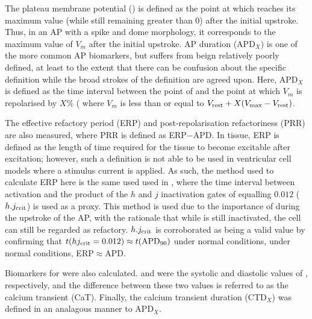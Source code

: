 \documentclass[../thesis-main.tex]{subfiles}
\begin{document}
The plateau membrane potential (\vplat{}) is defined as the point at which \dvdt{} reaches its maximum value (while still remaining greater than 0) after the initial upstroke. Thus, in an AP with a spike and dome morphology, it corresponds to the maximum value of $V_m$ after the initial upstroke. AP duration (APD$_X$) is one of the more common AP biomarkers, but suffers from beign relatively poorly defined, at least to the extent that there can be confusion about the specific definition while the broad strokes of the definition are agreed upon. Here, APD$_X$ is defined as the time interval between the point of \dvdtmax{} and the point at which $V_m$ is repolarised by $X\%$ (\idest{} where $V_m$ is less than or equal to $V_\textnormal{rest}+X(V_\textnormal{max}-V_\textnormal{rest})$.

The effective refactory period (ERP) and post-repolarisation refactoriness (PRR) are also measured, where PRR is defined as ERP$-$APD. In tissue, ERP is defined as the length of time required for the tissue to become excitable after excitation; however, such a definition is not able to be used in ventricular cell models where a stimulus current is applied. As such, the method used to calculate ERP here is the same used used in \citet{Tice2007, Romero2009a, Trenor2007, Pandit2013}, where the time interval between activation and the product of the $h$ and $j$ inactivation gates of \ina{} equalling $0.012$ ($h.j_\textnormal{crit}$) is used as a proxy. This method is used due to the importance of \ina{} during the upstroke of the AP, with the rationale that while \ina{} is still inactivated, the cell can still be regarded as refactory. $h.j_\textnormal{crit}$ is corroborated as being a valid value by confirming that $t(hj_\textnormal{crit}=0.012) \approx t(\textnormal{APD}_\textnormal{90})$ under normal conditions, \idest{} under normal conditions, ERP$\approx$APD.

Biomarkers for \cai{} were also calculated. \casys{} and \cadia{} were the systolic and diastolic values of \cai{}, respectively, and the difference between these two values is referred to as the calcium transient (CaT). Finally, the calcium transient duration (CTD$_X$) was defined in an analagous manner to APD$_X$.
\end{document}
